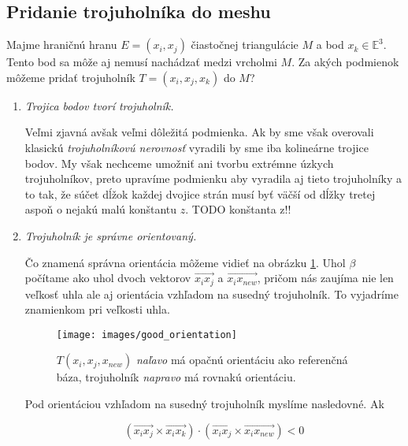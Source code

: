\subsection{Pridanie trojuholníka do meshu}
\label{kap:triangle_conditions}

Majme hraničnú hranu $E=(x_i, x_j)$ čiastočnej triangulácie $M$ a bod $x_k \in \mathbb{E}^3$. 
Tento bod sa môže aj nemusí nachádzať medzi vrcholmi $M$. Za akých podmienok môžeme pridať trojuholník 
$T=(x_i, x_j, x_k)$ do $M$?

\begin{enumerate}
    \item{
        \textit{Trojica bodov tvorí trojuholník.}


        Veľmi zjavná avšak veľmi dôležitá podmienka. Ak by sme však overovali klasickú 
        \textit{trojuholníkovú nerovnosť} vyradili by sme iba kolineárne trojice bodov. My však nechceme 
        umožniť ani tvorbu extrémne úzkych trojuholníkov, preto upravíme podmienku aby vyradila aj tieto
        trojuholníky a to tak, že súčet dĺžok každej dvojice strán musí byť väčší od dĺžky tretej aspoň
        o nejakú malú konštantu $z$.
        TODO konštanta z!!
    } 

    \item{
        \textit{Trojuholník je správne orientovaný.}


        Čo znamená správna orientácia môžeme vidieť na obrázku \ref{obr:good_orientation}. Uhol $\beta$
        počítame ako uhol dvoch vektorov $\overrightarrow{x_i x_j}$ a $\overrightarrow{x_i x_{new}}$, 
        pričom nás zaujíma nie len veľkosť uhla ale aj orientácia vzhľadom na susedný trojuholník. To 
        vyjadríme znamienkom pri veľkosti uhla. 

        \begin{figure}
            \centerline{\texttt{[image: images/good\_orientation]}}
            \caption[Orientácia bázy vzhľadom na referenčnú bázu]{$T(x_i, x_j, x_{new})$ \textit{naľavo} má opačnú orientáciu ako referenčná báza, trojuholník \textit{napravo} má rovnakú orientáciu.}
            \label{obr:good_orientation}
        \end{figure}

        Pod orientáciou vzhľadom na susedný trojuholník myslíme nasledovné.
        Ak

        \begin{equation}
        \label{eq:vector_space_orientation}
        (\overrightarrow{x_i x_j} \times \overrightarrow{x_i x_k}) 
        \cdot (\overrightarrow{x_i x_j} \times \overrightarrow{x_i x_{new}}) < 0
        \end{equation}

}
\end{enumerate}

